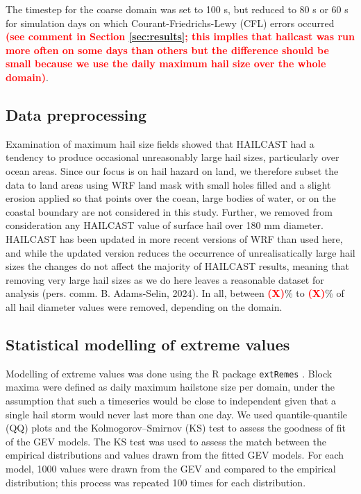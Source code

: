 \documentclass[]{agujournal2019}\usepackage[]{graphicx}\usepackage[]{xcolor}
\newcommand*{\todo}[1]{\textbf{\textcolor{red}{(#1)}}}
\begin{document}
The timestep for the coarse domain was set to 100 s, but reduced to 80 s or 60 s for simulation days on which Courant-Friedrichs-Lewy (CFL) errors occurred \todo{see comment in Section \ref{sec:results}; this implies that hailcast was run more often on some days than others but the difference should be small because we use the daily maximum hail size over the whole domain}.


\subsection{Data preprocessing}

Examination of maximum hail size fields showed that HAILCAST had a tendency to produce occasional unreasonably large hail sizes, particularly over ocean areas. Since our focus is on hail hazard on land, we therefore subset the data to land areas using WRF land mask with small holes filled and a slight erosion applied so that points over the coean, large bodies of water, or on the coastal boundary are not considered in this study. Further, we removed from consideration any HAILCAST value of surface hail over 180 mm diameter. HAILCAST has been updated in more recent versions of WRF than used here, and while the updated version reduces the occurrence of unrealisatically large hail sizes the changes do not affect the majority of HAILCAST results, meaning that removing very large hail sizes as we do here leaves a reasonable dataset for analysis (pers. comm. B. Adams-Selin, 2024). In all, between \todo{X}\% to \todo{X}\% of all hail diameter values were removed, depending on the domain.

\subsection{Statistical modelling of extreme values}

Modelling of extreme values was done using the R \cite{R_software} package \texttt{extRemes} \cite{Gilleland_JSS_2016}. Block maxima were defined as daily maximum hailstone size per domain, under the assumption that such a timeseries would be close to independent \cite{Coles_2001} given that a single hail storm would never last more than one day. We used quantile-quantile (QQ) plots \cite{Coles_2001} and the Kolmogorov–Smirnov (KS) test to assess the goodness of fit of the GEV models. The KS test was used to assess the match between the empirical distributions and values drawn from the fitted GEV models. For each model, 1000 values were drawn from the GEV and compared to the empirical distribution; this process was repeated 100 times for each distribution.
\end{document}
